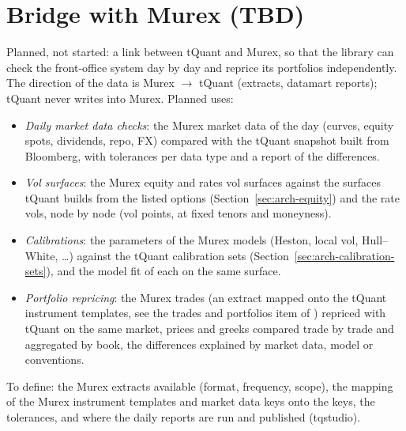 \section{Bridge with Murex (TBD)}\label{sec:arch-murex}
Planned, not started: a link between tQuant and Murex, so that the library can check the front-office system day by
day and reprice its portfolios independently. The direction of the data is Murex $\to$ tQuant (extracts, datamart
reports); tQuant never writes into Murex. Planned uses:
\begin{itemize}[nosep]
  \item \emph{Daily market data checks}: the Murex market data of the day (curves, equity spots, dividends, repo, FX)
        compared with the tQuant snapshot built from Bloomberg, with tolerances per data type and a report of the
        differences.
  \item \emph{Vol surfaces}: the Murex equity and rates vol surfaces against the surfaces tQuant builds from the
        listed options (Section~\ref{sec:arch-equity}) and the rate vols, node by node (vol points, at fixed tenors and
        moneyness).
  \item \emph{Calibrations}: the parameters of the Murex models (Heston, local vol, Hull--White, \dots) against the
        tQuant calibration sets (Section~\ref{sec:arch-calibration-sets}), and the model fit of each on the same
        surface.
  \item \emph{Portfolio repricing}: the Murex trades (an extract mapped onto the tQuant instrument templates, see the
        trades and portfolios item of ) repriced with tQuant on the same market, prices and greeks
        compared trade by trade and aggregated by book, the differences explained by market data, model or
        conventions.
\end{itemize}
To define: the Murex extracts available (format, frequency, scope), the mapping of the Murex instrument templates
and market data keys onto the  keys, the tolerances, and where the daily reports are run
and published (tqstudio).
